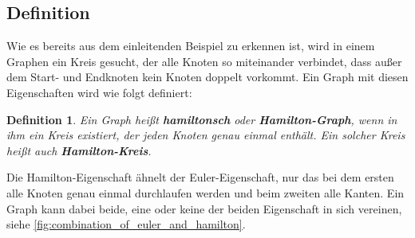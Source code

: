 \documentclass{article}
\newtheorem{mydef}{Definition}
\begin{document}
%
%
%



%
%
%
\subsection{Definition}

Wie es bereits aus dem einleitenden Beispiel zu erkennen ist, wird in einem Graphen ein Kreis gesucht, der alle Knoten so miteinander verbindet, dass außer dem Start- und Endknoten kein Knoten doppelt vorkommt. Ein Graph mit diesen Eigenschaften wird wie folgt definiert:

\begin{mydef}\label{thm:definition_hamilton_graph}
	Ein Graph heißt \textbf{hamiltonsch} oder \textbf{Hamilton-Graph}, wenn in ihm ein Kreis existiert, der jeden Knoten genau einmal enthält. Ein solcher Kreis heißt auch \textbf{Hamilton-Kreis}. \cite{busing2010graphen}
\end{mydef}

Die Hamilton-Eigenschaft ähnelt der Euler-Eigenschaft, nur das bei dem ersten alle Knoten genau einmal durchlaufen werden und beim zweiten alle Kanten. Ein Graph kann dabei beide, eine oder keine der beiden Eigenschaft in sich vereinen, siehe \autoref{fig:combination_of_euler_and_hamilton}.
\end{document}
